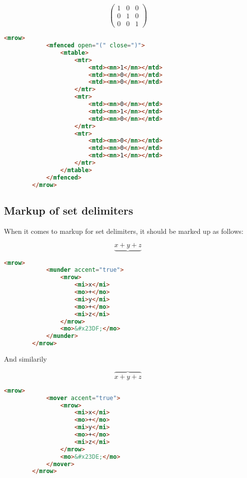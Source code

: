 \documentclass[english,a4paper,11pt]{article}
\begin{document}
\begin{examples}
	\begin{equation}
	\begin{pmatrix}
		1 & 0 & 0\\
		0 & 1 & 0\\
		0 & 0 & 1
	\end{pmatrix}
	\end{equation}

	\begin{lstlisting}[language=HTML]
		<mrow>
			<mfenced open="(" close=")">
				<mtable>
					<mtr>
						<mtd><mn>1</mn></mtd>
						<mtd><mn>0</mn></mtd>
						<mtd><mn>0</mn></mtd>
					</mtr>
					<mtr>
						<mtd><mn>0</mn></mtd>
						<mtd><mn>1</mn></mtd>
						<mtd><mn>0</mn></mtd>
					</mtr>
					<mtr>
						<mtd><mn>0</mn></mtd>
						<mtd><mn>0</mn></mtd>
						<mtd><mn>1</mn></mtd>
					</mtr>
				</mtable>
			</mfenced>
	  	</mrow>
	\end{lstlisting}
\end{examples}

\subsection{Markup of set delimiters}

When it comes to markup for set delimiters, it should be marked up as follows:

\begin{examples}
	\begin{equation}
		\underbrace{x+y+z}
	\end{equation}

	\begin{lstlisting}[language=HTML]
		<mrow>
			<munder accent="true">
				<mrow>
					<mi>x</mi>
					<mo>+</mo>
					<mi>y</mi>
					<mo>+</mo>
					<mi>z</mi>
				</mrow>
				<mo>&#x23DF;</mo>
			</munder>
	  	</mrow>
	\end{lstlisting}


And similarily

	\begin{equation}
		\overbrace{x+y+z}
	\end{equation}

	\begin{lstlisting}[language=HTML]
		<mrow>
			<mover accent="true">
				<mrow>
					<mi>x</mi>
					<mo>+</mo>
					<mi>y</mi>
					<mo>+</mo>
					<mi>z</mi>
				</mrow>
				<mo>&#x23DE;</mo>
			</mover>
	  	</mrow>
	\end{lstlisting}
\end{examples}
\end{document}
